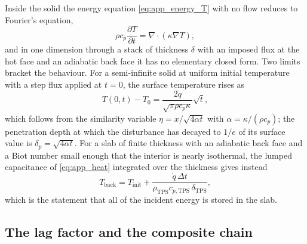 Inside the solid the energy equation \eqref{eq:app_energy_T} with no flow reduces to Fourier's equation,
\begin{equation}
    \rho c_p\frac{\partial T}{\partial t} = \nabla\cdot(\kappa\nabla T) ,
    \label{eq:app_heat}
\end{equation}
and in one dimension through a stack of thickness $\delta$ with an imposed flux at the hot face and an adiabatic back face it has no elementary closed form. Two limits bracket the behaviour. For a semi-infinite solid at uniform initial temperature with a step flux applied at $t=0$, the surface temperature rises as
\begin{equation}
    T(0,t) - T_0 = \frac{2\dot{q}}{\sqrt{\pi\rho c_p\kappa}}\sqrt{t} ,
    \label{eq:app_semi_infinite}
\end{equation}
which follows from the similarity variable $\eta = x/\sqrt{4\alpha t}$ with $\alpha = \kappa/(\rho c_p)$; the penetration depth at which the disturbance has decayed to $1/e$ of its surface value is $\delta_p = \sqrt{4\alpha t}$. For a slab of finite thickness with an adiabatic back face and a Biot number small enough that the interior is nearly isothermal, the lumped capacitance of \eqref{eq:app_heat} integrated over the thickness gives instead
\begin{equation}
    T_{\mathrm{back}} = T_{\mathrm{init}} + \frac{\dot{q}\,\Delta t}{\rho_{\mathrm{TPS}}c_{p,\mathrm{TPS}}\,\delta_{\mathrm{TPS}}} ,
    \label{eq:app_lumped}
\end{equation}
which is the statement that all of the incident energy is stored in the slab.

\subsection{The lag factor and the composite chain}

